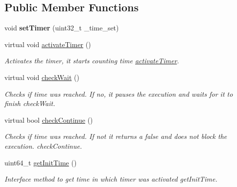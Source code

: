 \subsection*{Public Member Functions}
\begin{DoxyCompactItemize}
\item 
void {\bfseries set\+Timer} (uint32\+\_\+t \+\_\+time\+\_\+set)\hypertarget{classRHATypes_1_1Timer_a3a6da4a03f68e24dc1dfb6e5dcdcd807}{}\label{classRHATypes_1_1Timer_a3a6da4a03f68e24dc1dfb6e5dcdcd807}

\item 
virtual void \hyperlink{classRHATypes_1_1Timer_a4eb48a47df3e8de23513a058063631bc}{activate\+Timer} ()\hypertarget{classRHATypes_1_1Timer_a4eb48a47df3e8de23513a058063631bc}{}\label{classRHATypes_1_1Timer_a4eb48a47df3e8de23513a058063631bc}

\begin{DoxyCompactList}\small\item\em Activates the timer, it starts counting time  \hyperlink{classactivateTimer}{activate\+Timer}. \end{DoxyCompactList}\item 
virtual void \hyperlink{classRHATypes_1_1Timer_ad4b4d5aa5fb45044ee3370d8e56e1e3f}{check\+Wait} ()\hypertarget{classRHATypes_1_1Timer_ad4b4d5aa5fb45044ee3370d8e56e1e3f}{}\label{classRHATypes_1_1Timer_ad4b4d5aa5fb45044ee3370d8e56e1e3f}

\begin{DoxyCompactList}\small\item\em Checks if time was reached. If no, it pauses the execution and waits for it to finish  check\+Wait. \end{DoxyCompactList}\item 
virtual bool \hyperlink{classRHATypes_1_1Timer_a0d2a82909a9af9947b222ed5b3b8ea07}{check\+Continue} ()
\begin{DoxyCompactList}\small\item\em Checks if time was reached. If not it returns a false and does not block the execution.  check\+Continue. \end{DoxyCompactList}\item 
uint64\+\_\+t \hyperlink{classRHATypes_1_1Timer_a424e0c132b1e6484ecacdf9ce2b950bc}{get\+Init\+Time} ()
\begin{DoxyCompactList}\small\item\em Interface method to get time in which timer was activated  get\+Init\+Time. \end{DoxyCompactList}\end{DoxyCompactItemize}

